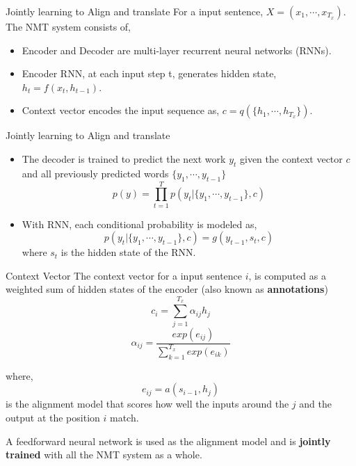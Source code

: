 ﻿\documentclass[aspectratio=43,mathserif,xcolor={usenames,dvipsnames,svgnames,table},10pt]{beamer}
\begin{document}
\begin{frame}{Jointly learning to Align and translate}
For a input sentence, $X = (x_1,\cdots, x_{T_{x}} )$. The NMT 
system consists of,
  \begin{itemize}
   \item Encoder and Decoder are multi-layer recurrent neural networks (RNNs).
   \item Encoder RNN, at each input step t, generates hidden state, $h_t = f(x_t, h_{t-1})$.
   \item Context vector encodes the input sequence as, $c = q(\{h_1,\cdots,h_{T_x}\})$.
  \end{itemize}
\end{frame}

\begin{frame}{Jointly learning to Align and translate}
\begin{itemize}
 \item The decoder is trained to predict the next work $y_t$ given the context vector $c$ and all previously predicted words $\{ y_1, \cdots, y_{t-1}\}$
 $$ p(y) = \prod^{T}_{t=1} p(y_t | \{ y_1, \cdots, y_{t-1}\} ,c ) $$
 \item With RNN, each conditional probability is modeled as,
 $$ p(y_t | \{ y_1, \cdots, y_{t-1}\}, c) = g(y_{t-1}, s_t, c) $$ where $s_t$ is the hidden state of the RNN.
 \end{itemize}

\end{frame}


\begin{frame}{Context Vector}
  The context vector for a input sentence $i$, is computed as a weighted sum of hidden states of the encoder (also known as \textbf{annotations})
  $$ c_i = \sum_{j=1}^{T_{x}} \alpha_{ij} h_j$$
  $$ \alpha_{ij} = \frac{ exp(e_{ij})}{ \sum_{k=1}^{T_x} exp (e_{ik})}$$

where,
$$ e_{ij} = a(s_{i-1}, h_j)  $$ is the alignment model that scores how well the inputs around the $j$ and the output at the position $i$ match.

A feedforward neural network is used as the alignment model and is \textbf{jointly trained} with all the NMT system as a whole.
\end{frame}
\end{document}

